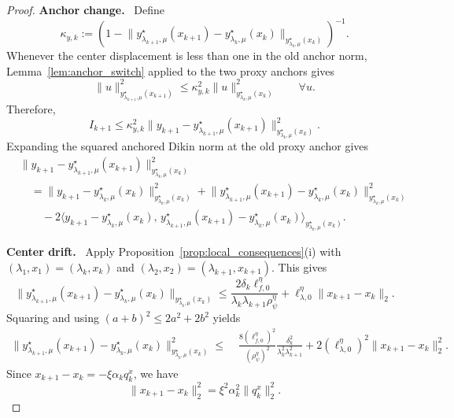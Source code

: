 \documentclass{article}
\newcommand{\proofstep}[1]{\par\smallskip\noindent\textbf{#1}\ }
\begin{document}
\begin{proof}
\proofstep{Anchor change.}
Define
\[
\kappa_{y,k}
:=
\left(
1-
\big\|y_{\lambda_{k+1},\mu}^\star(x_{k+1})
-y_{\lambda_k,\mu}^\star(x_k)\big\|_{y_{\lambda_k,\mu}^\star(x_k)}
\right)^{-1}.
\]
Whenever the center displacement is less than one in the old anchor norm, Lemma~\ref{lem:anchor_switch}
applied to the two proxy anchors gives
\[
\|u\|_{y_{\lambda_{k+1},\mu}^\star(x_{k+1})}^2
\le
\kappa_{y,k}^2
\|u\|_{y_{\lambda_k,\mu}^\star(x_k)}^2
\qquad \forall u.
\]
Therefore,
\begin{equation}
\label{eq:proxy_anchor_switch}
I_{k+1}
\le
\kappa_{y,k}^2
\big\|y_{k+1}-y_{\lambda_{k+1},\mu}^\star(x_{k+1})
\big\|_{y_{\lambda_k,\mu}^\star(x_k)}^2 .
\end{equation}
Expanding the squared anchored Dikin norm at the old proxy anchor gives
\begin{align}
&\big\|y_{k+1}-y_{\lambda_{k+1},\mu}^\star(x_{k+1})
\big\|_{y_{\lambda_k,\mu}^\star(x_k)}^2
\nonumber\\
&\quad =
\big\|y_{k+1}-y_{\lambda_k,\mu}^\star(x_k)
\big\|_{y_{\lambda_k,\mu}^\star(x_k)}^2
+
\big\|y_{\lambda_{k+1},\mu}^\star(x_{k+1})
-y_{\lambda_k,\mu}^\star(x_k)
\big\|_{y_{\lambda_k,\mu}^\star(x_k)}^2
\nonumber\\
&\qquad
-2
\Big\langle
y_{k+1}-y_{\lambda_k,\mu}^\star(x_k),\,
y_{\lambda_{k+1},\mu}^\star(x_{k+1})
-y_{\lambda_k,\mu}^\star(x_k)
\Big\rangle_{y_{\lambda_k,\mu}^\star(x_k)} .
\label{eq:proxy_three_term_expansion}
\end{align}

\proofstep{Center drift.}
Apply Proposition~\ref{prop:local_consequences}\textup{(i)} with
\((\lambda_1,x_1)=(\lambda_k,x_k)\) and
\((\lambda_2,x_2)=(\lambda_{k+1},x_{k+1})\). This gives
\begin{equation}
\label{eq:proxy_center_drift}
\big\|y_{\lambda_{k+1},\mu}^\star(x_{k+1})
-y_{\lambda_k,\mu}^\star(x_k)
\big\|_{y_{\lambda_k,\mu}^\star(x_k)}
\le
\frac{2\delta_k\ell_{f,0}^\eta}{\lambda_k\lambda_{k+1}\rho_\psi^\eta}
+
\ell_{\lambda,0}^\eta\|x_{k+1}-x_k\|_2 .
\end{equation}
Squaring and using \((a+b)^2\le 2a^2+2b^2\) yields
\begin{align}
\label{eq:proxy_center_drift_square}
\big\|y_{\lambda_{k+1},\mu}^\star(x_{k+1})
-y_{\lambda_k,\mu}^\star(x_k)
\big\|_{y_{\lambda_k,\mu}^\star(x_k)}^2
\le\;&
\frac{8(\ell_{f,0}^\eta)^2}{(\rho_\psi^\eta)^2}
\frac{\delta_k^2}{\lambda_k^2\lambda_{k+1}^2}
+
2(\ell_{\lambda,0}^\eta)^2\|x_{k+1}-x_k\|_2^2 .
\end{align}
Since \(x_{k+1}-x_k=-\xi\alpha_k q_k^x\), we have
\[
\|x_{k+1}-x_k\|_2^2
=
\xi^2\alpha_k^2\|q_k^x\|_2^2 .
\]


\end{proof}
\end{document}
